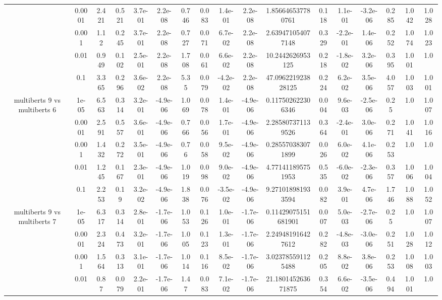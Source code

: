 \begin{tabular}{|c|c|c|c|c|c|c|c|c|c|c|c|c|c|c|c|c|}
 & 0.0001 & 2.421 & 0.521 & 3.7e-01 & 2.2e-08 & 0.746 & 0.083 & 1.4e-01 & 2.2e-08 & 1.856646537780761 & 0.118 & 1.1e-01 & -3.2e-06 & 0.285 & 1.042 & 1.028 \\
 & 0.001 & 1.12 & 0.245 & 3.7e-01 & 2.2e-08 & 0.727 & 0.071 & 6.7e-02 & 2.2e-08 & 2.639471054077148 & 0.329 & -2.2e-01 & 1.4e-06 & 0.252 & 1.074 & 1.023 \\
 & 0.01 & 0.949 & 0.102 & 2.5e-01 & 2.2e-08 & 1.708 & 0.061 & 6.6e-02 & 2.2e-08 & 10.2442626953125 & 0.218 & -1.8e-02 & 3.2e-06 & 0.395 & 1.001 & 1.0 \\
 & 0.1 & 3.365 & 0.296 & 3.6e-02 & 2.2e-08 & 5.35 & 0.079 & -4.2e-02 & 2.2e-08 & 47.096221923828125 & 0.224 & 6.2e-02 & 3.5e-06 & 4.057 & 1.003 & 1.001 \\
\hline
\multirow{5}{*}{multiberts 9 vs multiberts 6} & 1e-05 & 6.563 & 0.314 & 3.2e-01 & -4.9e-06 & 1.069 & 0.078 & 1.4e-01 & -4.9e-06 & 0.117502622306346 & 0.004 & 9.6e-03 & -2.5e-06 & 0.25 & 1.0 & 1.007 \\
 & 0.0001 & 2.591 & 0.557 & 3.6e-01 & -4.9e-06 & 0.766 & 0.056 & 1.7e-01 & -4.9e-06 & 2.285807371139526 & 0.364 & -2.4e-01 & 3.0e-06 & 0.271 & 1.041 & 1.016 \\
 & 0.001 & 1.432 & 0.272 & 3.5e-01 & -4.9e-06 & 0.76 & 0.058 & 9.5e-02 & -4.9e-06 & 0.285570383071899 & 0.026 & 6.0e-02 & 4.1e-06 & 0.253 & 1.0 & 1.0 \\
 & 0.01 & 1.245 & 0.167 & 2.3e-01 & -4.9e-06 & 1.019 & 0.098 & 9.0e-02 & -4.9e-06 & 4.771411895751953 & 0.535 & -6.0e-02 & -2.3e-06 & 0.357 & 1.006 & 1.004 \\
 & 0.1 & 2.253 & 0.19 & 3.2e-02 & -4.9e-06 & 1.838 & 0.076 & -3.5e-02 & -4.9e-06 & 9.271018981933594 & 0.082 & 3.9e-01 & 4.7e-06 & 1.746 & 1.088 & 1.052 \\
\hline
\multirow{5}{*}{multiberts 9 vs multiberts 7} & 1e-05 & 6.317 & 0.314 & 2.8e-01 & -1.7e-06 & 1.053 & 0.126 & 1.0e-01 & -1.7e-06 & 0.11429075151681901 & 0.007 & 5.0e-03 & -2.7e-06 & 0.25 & 1.0 & 1.007 \\
 & 0.0001 & 2.324 & 0.473 & 3.2e-01 & -1.7e-06 & 1.005 & 0.123 & 1.3e-01 & -1.7e-06 & 2.249481916427612 & 0.282 & -4.8e-03 & -3.0e-06 & 0.251 & 1.028 & 1.012 \\
 & 0.001 & 1.564 & 0.313 & 3.1e-01 & -1.7e-06 & 1.014 & 0.116 & 8.5e-02 & -1.7e-06 & 3.023785591125488 & 0.205 & 8.8e-02 & 3.8e-06 & 0.253 & 1.008 & 1.003 \\
 & 0.01 & 0.87 & 0.079 & 2.2e-01 & -1.7e-06 & 1.47 & 0.083 & 7.1e-02 & -1.7e-06 & 21.180145263671875 & 0.354 & 6.6e-02 & -3.5e-06 & 0.494 & 1.001 & 1.0 \\

\end{tabular}
